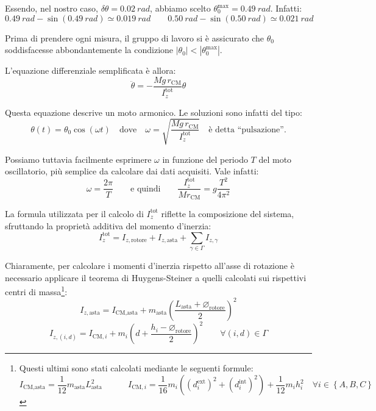 \documentclass{article}
\newcommand*{\diam}{\varnothing}
\begin{document}
Essendo, nel nostro caso, $\delta\theta=\qty{0.02}{rad}$, abbiamo scelto
$\theta_0^\text{max} = \qty{0.49}{rad}$. Infatti:
\[
  \qty{0.49}{rad} - \sin(\qty{0.49}{rad}) \simeq \qty{0.019}{rad}
  \qquad
  \qty{0.50}{rad} - \sin(\qty{0.50}{rad}) \simeq \qty{0.021}{rad}
\]

Prima di prendere ogni misura, il gruppo di lavoro si è assicurato
che $\theta_0$ soddisfacesse abbondantemente la condizione
$|\theta_0|<\left|\theta_0^\text{max}\right|$.

L'equazione differenziale semplificata è allora:
\[ \ddot{\theta} = -\frac{Mg\,r_\text{CM}}{I_z^\text{tot}} \theta \]

Questa equazione descrive un moto armonico. Le soluzioni sono infatti
del tipo:
\[
  \theta(t) = \theta_0\cos(\omega t)
  \quad\text{dove}\quad
  \omega = \sqrt{\frac{Mg\,r_\text{CM}}{I_z^\text{tot}}}\quad\text{è detta “pulsazione”}.
\]

Possiamo tuttavia facilmente esprimere $\omega$ in funzione del periodo
$T$ del moto oscillatorio, più semplice da calcolare dai dati acquisiti.
Vale infatti:
\[
  \omega = \frac{2\pi}{T}
  \qquad\text{e quindi}\qquad
  \frac{I_z^\text{tot}}{Mr_\text{CM}} = g \frac{T^2}{4\pi^2}
\]

La formula utilizzata per il calcolo di $I_z^\text{tot}$ riflette la composizione
del sistema, sfruttando la proprietà additiva del momento d'inerzia:
\[I_z^\text{tot} = I_{z,\text{rotore}} + I_{z,\text{asta}} + \sum_{\gamma\in\Gamma} I_{z,\gamma}\]

Chiaramente, per calcolare i momenti d'inerzia rispetto all'asse di
rotazione è necessario applicare il teorema di Huygens-Steiner
a quelli calcolati sui rispettivi centri di massa\footnote{
  Questi ultimi sono stati calcolati mediante le seguenti formule:
  \[
    I_\text{CM,asta} = \frac{1}{12} m_\text{asta} L_\text{asta}^2
    \qquad\quad
    I_{\text{CM},i} =
      \frac{1}{16}m_i\left(
        (d_i^\text{ext})^2 +
        (d_i^\text{int})^2
      \right) + \frac{1}{12} m_i h_i^2
    \quad\forall i \in \left\{A,B,C\right\}
  \]
}:
\[
  I_{z,\text{asta}} = I_\text{CM,asta} + m_\text{asta}\left(\frac{L_\text{asta} + \diam_\text{rotore}}{2}\right)^2
\]\[
  I_{z,(i,d)} = I_{\text{CM},i} + m_i\left(d + \frac{h_i - \diam_\text{rotore}}{2}\right)^2\qquad\forall(i,d)\in\Gamma
\]
\end{document}
